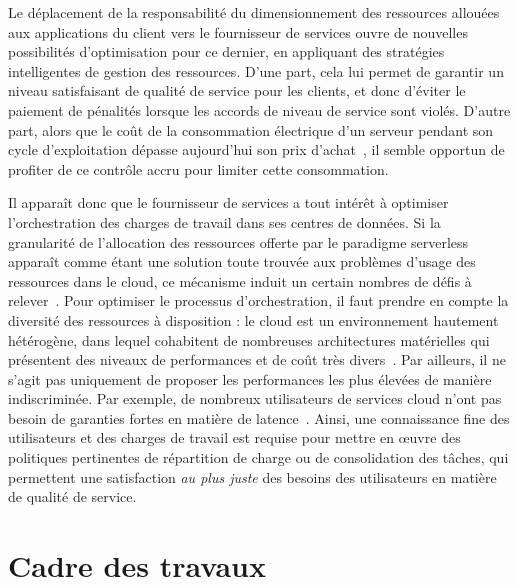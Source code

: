 Le déplacement de la responsabilité du dimensionnement des ressources allouées aux applications du client vers le fournisseur de services ouvre de nouvelles possibilités d'optimisation pour ce dernier, en appliquant des stratégies intelligentes de gestion des ressources. D'une part, cela lui permet de garantir un niveau satisfaisant de qualité de service pour les clients, et donc d'éviter le paiement de pénalités lorsque les accords de niveau de service sont violés. D'autre part, alors que le coût de la consommation électrique d'un serveur pendant son cycle d'exploitation dépasse aujourd'hui son prix d'achat~\cite{orgerieSurveyTechniquesImproving2014}, il semble opportun de profiter de ce contrôle accru pour limiter cette consommation. %

Il apparaît donc que le fournisseur de services a tout intérêt à optimiser l'orchestration des charges de travail dans ses centres de données. Si la granularité de l'allocation des ressources offerte par le paradigme serverless apparaît comme étant une solution toute trouvée aux problèmes d'usage des ressources dans le cloud, ce mécanisme induit un certain nombres de défis à relever~\cite{Lannurien2023}. Pour optimiser le processus d'orchestration, il faut prendre en compte la diversité des ressources à disposition : le cloud est un environnement hautement hétérogène, dans lequel cohabitent de nombreuses architectures matérielles qui présentent des niveaux de performances et de coût très divers~\cite{reissHeterogeneityDynamicityClouds}. Par ailleurs, il ne s'agit pas uniquement de proposer les performances les plus élevées de manière indiscriminée. Par exemple, de nombreux utilisateurs de services cloud n'ont pas besoin de garanties fortes en matière de latence~\cite{tirmaziBorgNextGeneration2020}. Ainsi, une connaissance fine des utilisateurs et des charges de travail est requise pour mettre en œuvre des politiques pertinentes de répartition de charge ou de consolidation des tâches, qui permettent une satisfaction \textit{au plus juste} des besoins des utilisateurs en matière de qualité de service.

\section{Cadre des travaux}

